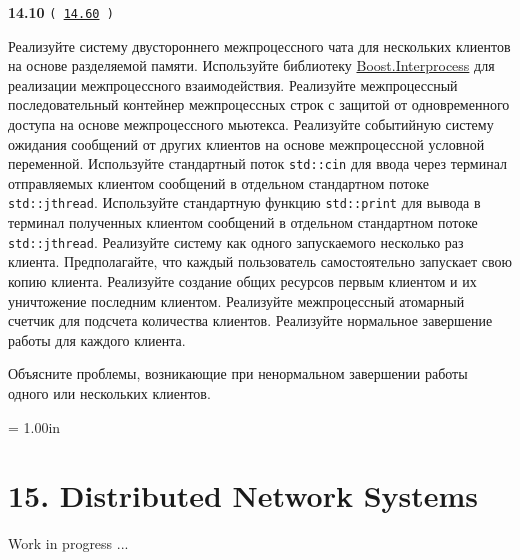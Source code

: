 \documentclass[a4paper,12pt]{article}
\begin{document}
{\large \textbf{14.10} \texttt{(\,\href{https://github.com/i-s-m-mipt/Education/blob/master/projects/examples/source/14.60.cpp}{14.60}\,)}}

\bigskip

Реализуйте систему двустороннего межпроцессного чата для нескольких клиентов на основе разделяемой памяти. Используйте библиотеку \href{https://www.boost.org/doc/libs/latest/doc/html/interprocess.html}{Boost.Interprocess} для реализации межпроцессного взаимодействия. Реализуйте межпроцессный последовательный контейнер межпроцессных строк с защитой от одновременного доступа на основе межпроцессного мьютекса. Реализуйте событийную систему ожидания сообщений от других клиентов на основе межпроцессной условной переменной. Используйте стандартный поток \lstinline{std::cin} для ввода через терминал отправляемых клиентом сообщений в отдельном стандартном потоке \lstinline{std::jthread}. Используйте стандартную функцию \lstinline{std::print} для вывода в терминал полученных клиентом сообщений в отдельном стандартном потоке \lstinline{std::jthread}. Реализуйте систему как одного запускаемого несколько раз клиента. Предполагайте, что каждый пользователь самостоятельно запускает свою копию клиента. Реализуйте создание общих ресурсов первым клиентом и их уничтожение последним клиентом. Реализуйте межпроцессный атомарный счетчик для подсчета количества клиентов. Реализуйте нормальное завершение работы для каждого клиента. 

Объясните проблемы, возникающие при ненормальном завершении работы одного или нескольких клиентов.



\newpage\thispagestyle{empty}\pdfpageheight = 1.00in\enlargethispage{100in}

\section{15. Distributed Network Systems}

Work in progress ...
\end{document}
